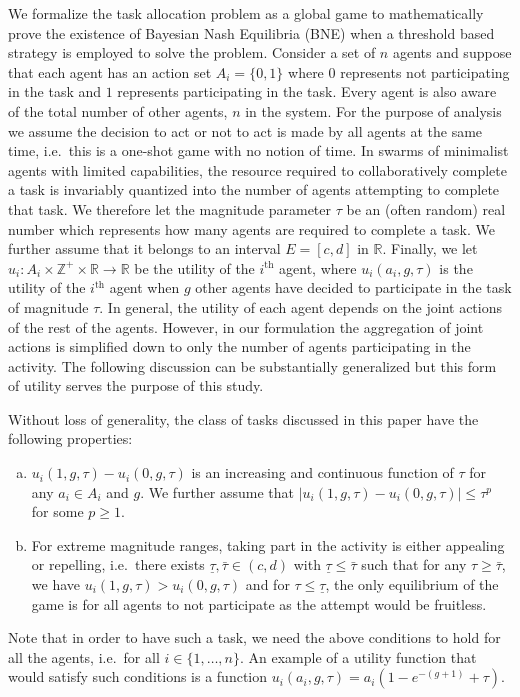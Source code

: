 \documentclass{nature}
\def\Z{\mathbb{Z}}    %
\def\R{\mathbb{R}}    %
\begin{document}
We formalize the task allocation problem as a global game to mathematically prove the existence of Bayesian Nash Equilibria (BNE) when a threshold based strategy is employed to solve the problem. Consider a set of $n$ agents and suppose that each agent has an action set $A_i=\{0,1\}$ where $0$ represents not participating in the task and $1$ represents participating in the task. Every agent is also aware of the total number of other agents, $n$ in the system. For the purpose of analysis we assume the decision to act or not to act is made by all agents at the same time, i.e.\ this is a one-shot game with no notion of time. In swarms of minimalist agents with limited capabilities, the resource required to collaboratively complete a task is invariably quantized into the number of agents attempting to complete that task. We therefore let the magnitude parameter $\tau$ be an (often random) real number which represents how many agents are required to complete a task. We further assume that it belongs to an interval $E=[c,d]$ in $\R$. Finally, we let $u_i:A_i\times\Z^+\times \R\to \R$ be the utility of the $i^{\text{th}}$ agent, where $u_i(a_i,g,\tau)$ is the utility of the $i^{\text{th}}$ agent when $g$ other agents have decided to participate in the task of magnitude $\tau$. In general, the utility of each agent depends on the joint actions of the rest of the agents. However, in our formulation the aggregation of joint actions is simplified down to only the number of agents participating in the activity. The following discussion can be substantially generalized but this form of utility serves the purpose of this study. 

Without loss of generality, the class of tasks discussed in this paper have the following properties:
\begin{enumerate}[a.]
	\item $u_i(1,g,\tau)-u_i(0,g,\tau)$ is an increasing and continuous function of $\tau$ for any $a_i\in A_i$ and $g$. We further assume that $|u_i(1,g,\tau)-u_i(0,g,\tau)|\leq \tau^p$ for some $p\geq 1$.
	\item For extreme magnitude ranges, taking part in the activity is either appealing or repelling, i.e.\ there exists $\underline{\tau},\bar{\tau}\in (c,d)$ with $\underline{\tau}\leq \bar{\tau}$ such that for any $\tau\geq \bar{\tau}$, we have $u_i(1,g,\tau)>u_i(0,g,\tau)$ and for $\tau\leq \underline{\tau}$, the only equilibrium of the game is for all agents to not participate as the attempt would be fruitless.
\end{enumerate}
%
Note that in order to have such a task, we need the above conditions to hold for all the agents, i.e.\ for all $i\in\{1,\ldots,n\}$. An example of a utility function that would satisfy such conditions is a function $u_i(a_i,g,\tau)=a_i(1-e^{-(g+1)}+\tau)$. 
\end{document}
